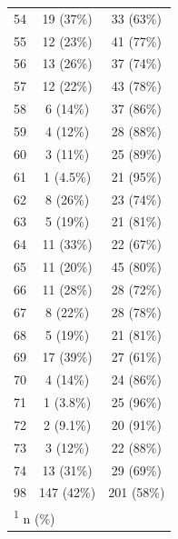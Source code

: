 \documentclass[
  letterpaper,
  DIV=11,
  numbers=noendperiod]{scrartcl}
\begin{document}
\begin{longtable}{lcc}
\hspace{1em}54 & 19 (37\%) & 33 (63\%)\\
\hspace{1em}55 & 12 (23\%) & 41 (77\%)\\
\hspace{1em}56 & 13 (26\%) & 37 (74\%)\\
\hspace{1em}57 & 12 (22\%) & 43 (78\%)\\
\hspace{1em}58 & 6 (14\%) & 37 (86\%)\\
\hspace{1em}59 & 4 (12\%) & 28 (88\%)\\
\hspace{1em}60 & 3 (11\%) & 25 (89\%)\\
\hspace{1em}61 & 1 (4.5\%) & 21 (95\%)\\
\hspace{1em}62 & 8 (26\%) & 23 (74\%)\\
\hspace{1em}63 & 5 (19\%) & 21 (81\%)\\
\hspace{1em}64 & 11 (33\%) & 22 (67\%)\\
\hspace{1em}65 & 11 (20\%) & 45 (80\%)\\
\hspace{1em}66 & 11 (28\%) & 28 (72\%)\\
\hspace{1em}67 & 8 (22\%) & 28 (78\%)\\
\hspace{1em}68 & 5 (19\%) & 21 (81\%)\\
\hspace{1em}69 & 17 (39\%) & 27 (61\%)\\
\hspace{1em}70 & 4 (14\%) & 24 (86\%)\\
\hspace{1em}71 & 1 (3.8\%) & 25 (96\%)\\
\hspace{1em}72 & 2 (9.1\%) & 20 (91\%)\\
\hspace{1em}73 & 3 (12\%) & 22 (88\%)\\
\hspace{1em}74 & 13 (31\%) & 29 (69\%)\\
\hspace{1em}98 & 147 (42\%) & 201 (58\%)\\*
\multicolumn{3}{l}{\rule{0pt}{1em}\textsuperscript{1} n (\%)}\\
\end{longtable}
\end{document}
